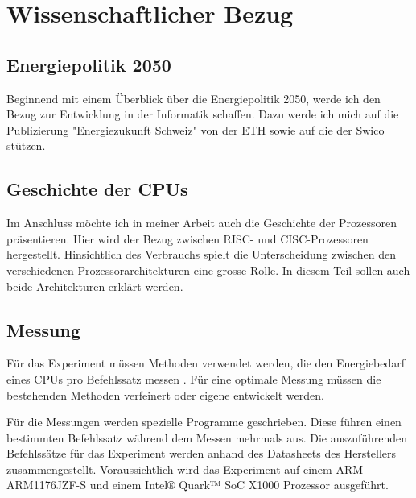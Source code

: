 \chapter{Wissenschaftlicher Bezug}

\section{Energiepolitik 2050}
Beginnend mit einem Überblick über die Energiepolitik 2050, werde ich den Bezug zur Entwicklung in der
Informatik schaffen. Dazu werde ich mich auf die Publizierung
"Energiezukunft Schweiz"\cite{eth_energiezukunft_schweiz} von der ETH sowie auf die\cite{swico_datenblatt}
der Swico stützen.

\section{Geschichte der CPUs}
Im Anschluss möchte ich in meiner Arbeit auch die Geschichte der Prozessoren präsentieren. Hier wird der Bezug
zwischen RISC- und CISC-Prozessoren hergestellt. Hinsichtlich des Verbrauchs spielt die Unterscheidung zwischen den verschiedenen 
Prozessorarchitekturen eine grosse Rolle\cite{stanford_risc_cisc}. In diesem Teil sollen auch beide Architekturen erklärt werden.


\section{Messung}
Für das Experiment müssen Methoden verwendet werden, die den Energiebedarf eines CPUs pro Befehlssatz messen
\cite{measuring_power_temperature, analysis_circuits, intel_epi}. Für eine optimale Messung müssen die bestehenden Methoden
verfeinert oder eigene entwickelt werden.
\par
Für die Messungen werden spezielle Programme geschrieben. Diese führen einen bestimmten Befehlssatz während dem Messen mehrmals aus.
Die auszuführenden Befehlssätze für das Experiment werden anhand des Datasheets des Herstellers zusammengestellt.
Voraussichtlich wird das Experiment auf einem ARM ARM1176JZF-S\cite{arm_datasheet} und einem Intel® Quark™ SoC
X1000 \cite{intel_datasheet} Prozessor ausgeführt.


